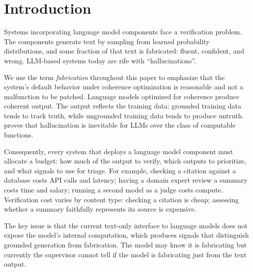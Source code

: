 \balance
\section{Introduction}\label{sec:intro}

Systems incorporating language model components face a verification problem.
The components generate text by sampling from learned probability distributions,
and some fraction of that text is fabricated: fluent, confident, and wrong.
LLM-based systems today are rife with ``hallucinations''.


We use the term \emph{fabrication} throughout this paper to emphasize that
the system's default behavior under coherence optimization is reasonable and
not a malfunction to be patched. Language models optimized for
coherence produce coherent output. The output reflects the training data: grounded
training data tends to track truth, while ungrounded training data tends to produce untruth.
\citeauthor{xu2024hallucination}~\cite{xu2024hallucination} proves that hallucination is
inevitable for LLMs over the class of computable functions.

Consequently, every system that
deploys a language model component must allocate a budget: how much of the output to verify,
which outputs to prioritize, and what signals to use for triage.
For example, checking a citation against a database costs API
calls and latency; having a domain expert review a summary costs time
and salary; running a second model as a judge costs compute.
Verification cost varies by content type: checking a citation is cheap;
assessing whether a summary faithfully represents its source is expensive.

The key issue is that the current text-only interface to language models does not expose the model's
internal computation, which produces signals that distinguish grounded generation from fabrication.
The model may know it is fabricating but currently the supervisor cannot tell if the model
is fabricating just from the text output. 

